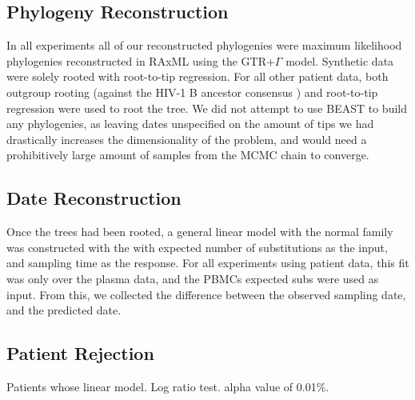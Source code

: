 \subsection{Phylogeny Reconstruction} \label{subsec:phylo}
In all experiments all of our reconstructed phylogenies were maximum likelihood phylogenies reconstructed in RAxML \citep{Raxml14} using the GTR+$\Gamma$ model. Synthetic data were solely rooted with root-to-tip regression. For all other patient data, both outgroup rooting (against the HIV-1 B ancestor consensus \citep{HIVBANC}) and root-to-tip regression \cite{Ape04} were used to root the tree. We did not attempt to use BEAST \citep{BEAST} to build any phylogenies, as leaving dates unspecified on the amount of tips we had drastically increases the dimensionality of the problem, and would need a prohibitively large amount of samples from the MCMC chain to converge.

\subsection{Date Reconstruction} \label{subsec:daterecon}
Once the trees had been rooted, a general linear model with the normal family was constructed with the with expected number of substitutions as the input, and sampling time as the response. For all experiments using patient data, this fit was only over the plasma data, and the PBMCs expected subs were used as input. From this, we collected the difference between the observed sampling date, and the predicted date. 


\subsection{Patient Rejection} \label{subsec:hypot}
Patients whose linear model. Log ratio test. alpha value of 0.01\%. 
